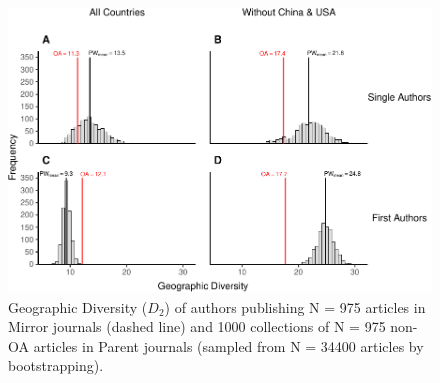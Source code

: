 \documentclass[
  english,
  man]{apa6}
\begin{document}
\begin{figure}

{\centering \includegraphics{Smith_etal_APC_ms_files/figure-latex/Fig4-1} 

}

\caption{Geographic Diversity ($D_2$) of authors publishing N =  975  articles in Mirror journals (dashed line) and 1000 collections of N =  975  non-OA articles in Parent journals (sampled from N =  34400  articles by bootstrapping).}\label{fig:Fig4}
\end{figure}
\end{document}
